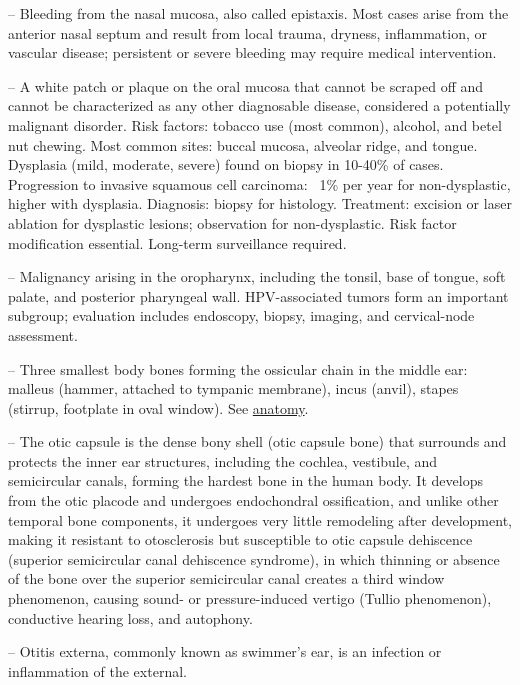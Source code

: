 -- Bleeding from the nasal mucosa, also called epistaxis. Most cases arise from the anterior nasal septum and result from local trauma, dryness, inflammation, or vascular disease; persistent or severe bleeding may require medical intervention.

-- A white patch or plaque on the oral mucosa that cannot be scraped off and cannot be characterized as any other diagnosable disease, considered a potentially malignant disorder. Risk factors: tobacco use (most common), alcohol, and betel nut chewing. Most common sites: buccal mucosa, alveolar ridge, and tongue. Dysplasia (mild, moderate, severe) found on biopsy in 10-40\% of cases. Progression to invasive squamous cell carcinoma: ~1\% per year for non-dysplastic, higher with dysplasia. Diagnosis: biopsy for histology. Treatment: excision or laser ablation for dysplastic lesions; observation for non-dysplastic. Risk factor modification essential. Long-term surveillance required.

-- Malignancy arising in the oropharynx, including the tonsil, base of tongue, soft palate, and posterior pharyngeal wall. HPV-associated tumors form an important subgroup; evaluation includes endoscopy, biopsy, imaging, and cervical-node assessment.

-- Three smallest body bones forming the ossicular chain in the middle ear: malleus (hammer, attached to tympanic membrane), incus (anvil), stapes (stirrup, footplate in oval window). See \hyperlink{Anatomy}{anatomy}.

-- The otic capsule is the dense bony shell (otic capsule bone) that surrounds and protects the inner ear structures, including the cochlea, vestibule, and semicircular canals, forming the hardest bone in the human body. It develops from the otic placode and undergoes endochondral ossification, and unlike other temporal bone components, it undergoes very little remodeling after development, making it resistant to otosclerosis but susceptible to otic capsule dehiscence (superior semicircular canal dehiscence syndrome), in which thinning or absence of the bone over the superior semicircular canal creates a third window phenomenon, causing sound- or pressure-induced vertigo (Tullio phenomenon), conductive hearing loss, and autophony.

-- Otitis externa, commonly known as swimmer’s ear, is an infection or inflammation of the external.

